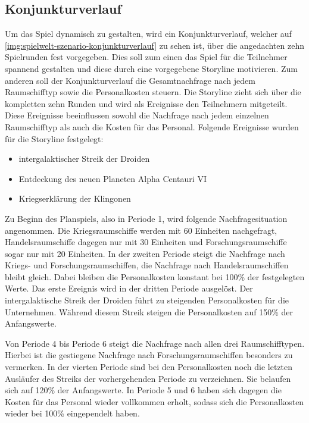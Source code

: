 \subsection{Konjunkturverlauf}
\label{sec:spielwelt-szenario-konjunkturverlauf}


Um das Spiel dynamisch zu gestalten, wird ein Konjunkturverlauf, welcher auf \vref{img:spielwelt-szenario-konjunkturverlauf} zu sehen ist, über die angedachten zehn Spielrunden fest vorgegeben. Dies soll zum einen das Spiel für die Teilnehmer spannend gestalten und diese durch eine vorgegebene Storyline motivieren. Zum anderen soll der Konjunkturverlauf die Gesamtnachfrage nach jedem Raumschifftyp sowie die Personalkosten steuern. Die Storyline zieht sich über die kompletten zehn Runden und wird als Ereignisse den Teilnehmern mitgeteilt. Diese Ereignisse beeinflussen sowohl die Nachfrage nach jedem einzelnen Raumschifftyp als auch die Kosten für das Personal. Folgende Ereignisse wurden für die Storyline festgelegt:

\begin{itemize}
\item intergalaktischer Streik der Droiden
\item Entdeckung des neuen Planeten Alpha Centauri VI
\item Kriegserklärung der Klingonen
\end{itemize}

Zu Beginn des Planspiels, also in Periode 1, wird folgende Nachfragesituation angenommen. Die Kriegsraumschiffe werden mit 60 Einheiten nachgefragt, Handelsraumschiffe dagegen nur mit 30 Einheiten und Forschungsraumschiffe sogar nur mit 20 Einheiten. In der zweiten Periode steigt die Nachfrage nach Kriegs- und Forschungsraumschiffen, die Nachfrage nach Handelsraumschiffen bleibt gleich. Dabei bleiben die Personalkosten konstant bei 100\% der festgelegten Werte. Das erste Ereignis wird in der dritten Periode ausgelöst. Der intergalaktische Streik der Droiden führt zu steigenden Personalkosten für die Unternehmen. Während diesem Streik steigen die Personalkosten auf 150\% der Anfangswerte.
 
Von Periode 4 bis Periode 6 steigt die Nachfrage nach allen drei Raumschifftypen. Hierbei ist die gestiegene Nachfrage nach Forschungsraumschiffen besonders zu vermerken. In der vierten Periode sind bei den Personalkosten noch die letzten Ausläufer des Streiks der vorhergehenden Periode zu verzeichnen. Sie belaufen sich auf 120\% der Anfangswerte. In Periode 5 und 6 haben sich dagegen die Kosten für das Personal wieder vollkommen erholt, sodass sich die Personalkosten wieder bei 100\% eingependelt haben.

